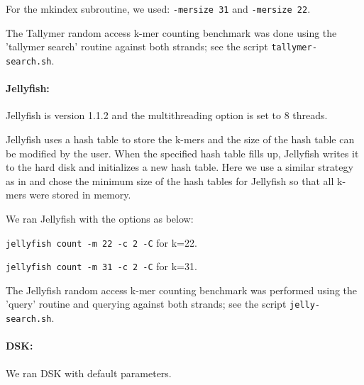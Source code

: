 \documentclass{article}
\begin{document}
For the mkindex subroutine, we used: {\tt -mersize 31} and {\tt -mersize 22}.

The Tallymer random access k-mer counting benchmark was done using the
'tallymer search' routine against both strands; see the script
{\tt tallymer-search.sh}.

\paragraph{Jellyfish:}
Jellyfish is version 1.1.2 and the multithreading option is set to 8 threads.

Jellyfish uses a hash table to store the k-mers and the size of the
hash table can be modified by the user.  When the specified hash table
fills up, Jellyfish writes it to the hard
disk and initializes a new hash table.  Here we use a
similar strategy as in \cite{Melsted2011} and chose the minimum size of the hash 
tables for Jellyfish so that all k-mers were stored in memory.

We ran Jellyfish with the options as below:

{\tt jellyfish count -m 22 -c 2 -C} for k=22.

{\tt jellyfish count -m 31 -c 2 -C} for k=31.

The Jellyfish random access k-mer counting benchmark was performed
using the 'query' routine and querying against both strands; see
the script {\tt jelly-search.sh}.

\paragraph{DSK:} We ran DSK with default parameters.


%




\end{document}
